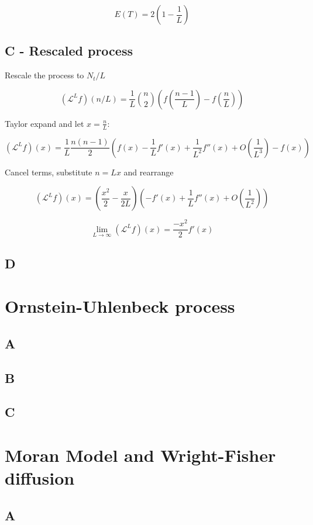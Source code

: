 \documentclass{article}
\begin{document}
$$E(T) = 2(1 - \frac{1}{L})$$


\subsection{C - Rescaled process}

Rescale the process to $N_t/L$

$$(\mathcal{L}^Lf)(n/L) = \frac{1}{L} {n\choose2} (f(\frac{n-1}{L}) - f(\frac{n}{L}))$$

Taylor expand and let $x=\frac{n}{L}$:

$$(\mathcal{L}^Lf)(x) = \frac{1}{L}\frac{n(n-1)}{2} (f(x) - \frac{1}{L}f'(x) + \frac{1}{L^2}f''(x) + O(\frac{1}{L^3}) - f(x))$$

Cancel terms, substitute $n=Lx$ and rearrange

$$(\mathcal{L}^Lf)(x) = (\frac{x^2}{2} - \frac{x}{2L})(- f'(x) + \frac{1}{L}f''(x) + O(\frac{1}{L^2}))$$

$$\lim_{L \to \infty} (\mathcal{L}^Lf)(x) = \frac{-x^2}{2}f'(x)$$






\subsection{D}

\section{Ornstein-Uhlenbeck process}

\subsection{A}

\subsection{B}

\subsection{C}

\section{Moran Model and Wright-Fisher diffusion}

\subsection{A}
\end{document}
